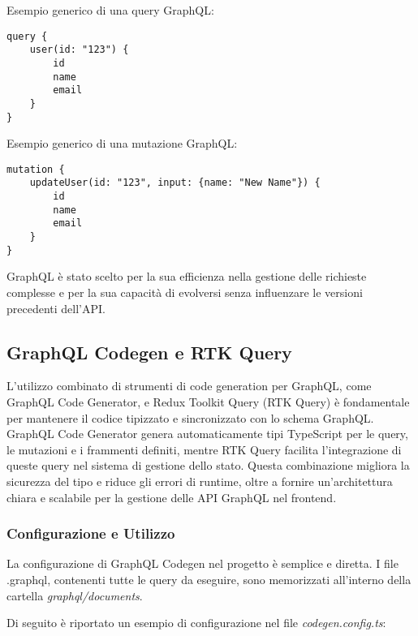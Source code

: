 Esempio generico di una query GraphQL:
\begin{verbatim}
query {
    user(id: "123") {
        id
        name
        email
    }
}
\end{verbatim}

Esempio generico di una mutazione GraphQL:
\begin{verbatim}
mutation {
    updateUser(id: "123", input: {name: "New Name"}) {
        id
        name
        email
    }
}
\end{verbatim}

GraphQL è stato scelto per la sua efficienza nella gestione delle richieste complesse e per la sua capacità di evolversi senza influenzare le versioni precedenti dell'API.

\subsection{GraphQL Codegen e RTK Query}
\label{subsec:graphql_codegen}

L'utilizzo combinato di strumenti di code generation per GraphQL, come GraphQL Code Generator, e Redux Toolkit Query (RTK Query) è fondamentale per mantenere il codice tipizzato e sincronizzato con lo schema GraphQL.
GraphQL Code Generator genera automaticamente tipi TypeScript per le query, le mutazioni e i frammenti definiti, mentre RTK Query facilita l'integrazione di queste query nel sistema di gestione dello stato.
Questa combinazione migliora la sicurezza del tipo e riduce gli errori di runtime, oltre a fornire un'architettura chiara e scalabile per la gestione delle API GraphQL nel frontend.

\subsubsection*{Configurazione e Utilizzo}
La configurazione di GraphQL Codegen nel progetto è semplice e diretta. I file .graphql, contenenti tutte le query da eseguire, sono memorizzati all'interno della cartella \textit{graphql/documents}.

Di seguito è riportato un esempio di configurazione nel file \textit{codegen.config.ts}:

